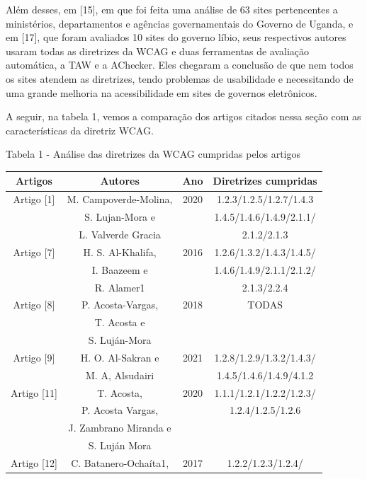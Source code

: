 \documentclass[a4paper]{article}
\begin{document}
\begin{titlepage}
Além desses, em [15], em que foi feita uma análise de 63 sites pertencentes a ministérios, departamentos e agências governamentais do Governo de Uganda, e em [17], que foram avaliados 10 sites do governo líbio, seus respectivos autores usaram todas as diretrizes da WCAG e duas ferramentas de avaliação automática, a TAW e a AChecker. Eles chegaram a conclusão de que nem todos os sites atendem as diretrizes, tendo problemas de usabilidade e necessitando de uma grande melhoria na acessibilidade em sites de governos eletrônicos.

A seguir, na tabela 1, vemos a comparação dos artigos citados nessa seção com as características da diretriz WCAG.

Tabela 1 - Análise das diretrizes da WCAG cumpridas pelos artigos\\[-1cm]
\begin{center}
	\fontsize{8pt}{8pt}\selectfont
	\begin{longtable}{|c|c|c|c|}
		\hline
		Artigos & Autores & Ano & Diretrizes cumpridas\\
		\hline
		Artigo [1] & M. Campoverde-Molina,& 2020 & 1.2.3/1.2.5/1.2.7/1.4.3\\
				   & S. Lujan-Mora e & & 1.4.5/1.4.6/1.4.9/2.1.1/\\
				   & L. Valverde Gracia & & 2.1.2/2.1.3\\
		\hline
		Artigo [7] & H. S. Al-Khalifa, & 2016 & 1.2.6/1.3.2/1.4.3/1.4.5/\\
				   & I. Baazeem e & & 1.4.6/1.4.9/2.1.1/2.1.2/\\
				   & R. Alamer1 & & 2.1.3/2.2.4\\
		\hline
		Artigo [8] & P. Acosta-Vargas, & 2018 & TODAS\\
				   & T. Acosta e & & \\
				   & S. Luján-Mora & & \\
		\hline
		Artigo [9] & H. O. Al-Sakran e & 2021 & 1.2.8/1.2.9/1.3.2/1.4.3/\\
				   & M. A, Alsudairi & & 1.4.5/1.4.6/1.4.9/4.1.2\\
		\hline
		Artigo [11] & T. Acosta, & 2020 & 1.1.1/1.2.1/1.2.2/1.2.3/\\
					& P. Acosta Vargas, & & 1.2.4/1.2.5/1.2.6\\
					& J. Zambrano Miranda e & & \\
					& S. Luján Mora & & \\
		\hline
		Artigo [12] & C. Batanero-Ochaíta1, & 2017 & 1.2.2/1.2.3/1.2.4/\\

\end{longtable}
\end{center}
\end{titlepage}
\end{document}
